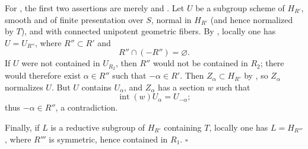 For \textup{}, the first two assertions are merely  and
. Let \(U\) be a subgroup scheme of \(H_{R'}\), smooth and of
finite presentation over \(S\), normal in \(H_{R'}\) \textup{(and
hence normalized by \(T\))}, and with connected unipotent geometric
fibers. By , locally one has \(U=U_{R''}\), where
\(R''\subset R'\) and
\[
  R''\cap(-R'')=\varnothing.
\]
If \(U\) were not contained in \(U_{R_2}\), then \(R''\) would not
be contained in \(R_2\); there would therefore exist
\(\alpha\in R''\) such that \(-\alpha\in R'\). Then
\(Z_\alpha\subset H_{R'}\) by , so \(Z_\alpha\) normalizes
\(U\). But \(U\) contains \(U_\alpha\), and \(Z_\alpha\) has a
section \(w\) such that
\[
  \operatorname{int}(w)U_\alpha=U_{-\alpha};
\]
thus \(-\alpha\in R''\), a contradiction.

Finally, if \(L\) is a reductive subgroup of \(H_{R'}\) containing
\(T\), locally one has \(L=H_{R'''}\), where \(R'''\) is symmetric,
hence contained in \(R_1\).
\hfill\(\square\)

